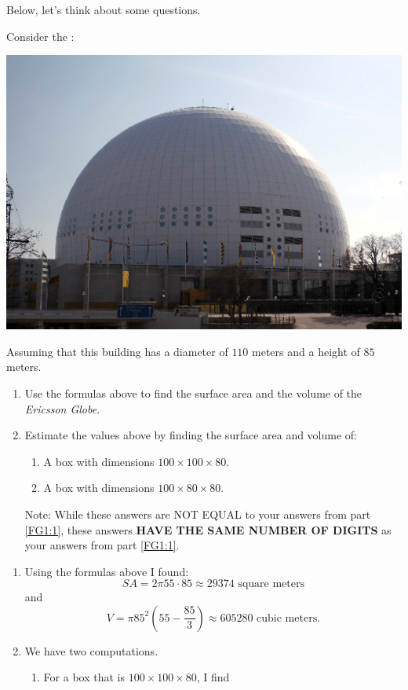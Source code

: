 \documentclass[nooutcomes,noauthor,hints]{ximera}
\begin{document}
Below, let's think about some questions. 


\mynewpage




\begin{question}
  Consider the :
   \begin{center}
    \includegraphics[width=.4\textwidth]{dome.png} %
   \end{center}
   Assuming that this building has a diameter of $110$ meters and a
   height of $85$ meters.
   \begin{enumerate}
   \item \label{FG1:1} Use the formulas above to find the surface area
     and the volume of the \textit{Ericsson Globe}.
   \item Estimate the values above by finding the surface area and
     volume of:
     \begin{enumerate}
     \item A box with dimensions $100\times 100 \times 80$.
     \item A box with dimensions $100\times 80 \times 80$.
     \end{enumerate}
   Note: While these answers are NOT EQUAL to your answers from
   part \ref{FG1:1}, these answers \textbf{HAVE THE SAME NUMBER OF
     DIGITS} as your answers from part \ref{FG1:1}.
   \end{enumerate}
   \begin{freeResponse}
     \begin{enumerate}
     \item Using the formulas above I found:
       \[
       SA = 2\pi 55\cdot 85 \approx 29374 \text{ square meters}
       \]
       and
       \[
       V = \pi85^2 \left(55-\frac{85}{3}\right)\approx  605280 \text{ cubic meters}.
       \]
     \item We have two computations.
       \begin{enumerate}
       \item For a box that is  $100\times 100 \times 80$, I find

\end{enumerate}
\end{enumerate}
\end{freeResponse}
\end{question}
\end{document}
